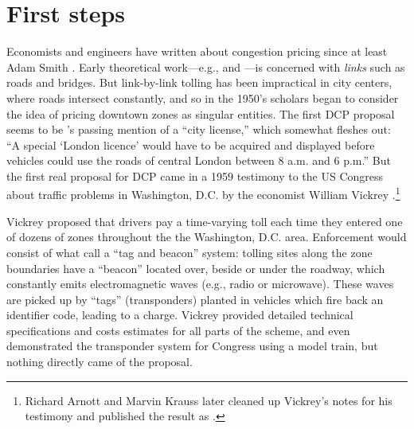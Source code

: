 \section{First steps}\label{sec:early}

Economists and engineers have written about congestion pricing since at least Adam Smith \citep{Lindsey2006}. Early theoretical work---e.g., \citet{Pigou1920} and \citet{Beckmann1956}---is concerned with \emph{links} such as roads and bridges. But link-by-link tolling has been impractical in city centers, where roads intersect constantly, and so in the 1950's scholars began to consider the idea of pricing downtown zones as singular entities. The first DCP proposal seems to be \citet{buchanan1952}'s passing mention of a ``city license,'' which \citet{Walters1954} somewhat fleshes out: ``A special `London licence' would have to be acquired and displayed before vehicles could use the roads of central London between 8 a.m. and 6 p.m.'' But the first real proposal for DCP came in a 1959 testimony to the US Congress about traffic problems in Washington, D.C. by the economist William Vickrey \citep{Vickrey1959}.\footnote{ Richard Arnott and Marvin Krauss later cleaned up Vickrey's notes for his testimony and published the result as \citet{Vickrey1994}.}

Vickrey proposed that drivers pay a time-varying toll each time they entered one of dozens of zones throughout the the Washington, D.C. area. Enforcement would consist of what \citet{DePalma2011} call a ``tag and beacon'' system: tolling sites along the zone boundaries have a ``beacon'' located over, beside or under the roadway, which constantly emits electromagnetic waves (e.g., radio or microwave). These waves are picked up by ``tags'' (transponders) planted in vehicles which fire back an identifier code, leading to a charge. Vickrey provided detailed technical specifications and costs estimates for all parts of the scheme, and even demonstrated the transponder system for Congress using a model train, but nothing directly came of the proposal.

